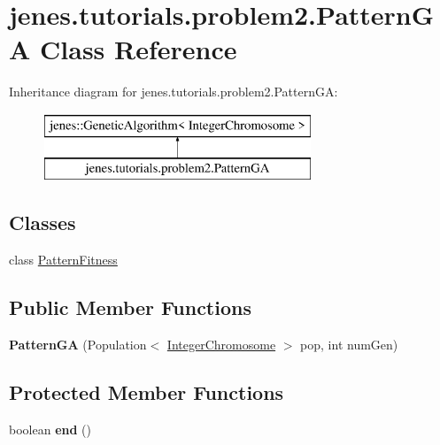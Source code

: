 \hypertarget{classjenes_1_1tutorials_1_1problem2_1_1_pattern_g_a}{\section{jenes.\-tutorials.\-problem2.\-Pattern\-G\-A Class Reference}
\label{classjenes_1_1tutorials_1_1problem2_1_1_pattern_g_a}
}
Inheritance diagram for jenes.\-tutorials.\-problem2.\-Pattern\-G\-A\-:\begin{figure}[H]
\begin{center}
\leavevmode
\includegraphics[height=2.000000cm]{classjenes_1_1tutorials_1_1problem2_1_1_pattern_g_a}
\end{center}
\end{figure}
\subsection*{Classes}
\begin{DoxyCompactItemize}
\item 
class \hyperlink{classjenes_1_1tutorials_1_1problem2_1_1_pattern_g_a_1_1_pattern_fitness}{Pattern\-Fitness}
\end{DoxyCompactItemize}
\subsection*{Public Member Functions}
\begin{DoxyCompactItemize}
\item 
\hypertarget{classjenes_1_1tutorials_1_1problem2_1_1_pattern_g_a_a009d1901fabdcabacb443297eb2295ce}{{\bfseries Pattern\-G\-A} (Population$<$ \hyperlink{classjenes_1_1chromosome_1_1_integer_chromosome}{Integer\-Chromosome} $>$ pop, int num\-Gen)}\label{classjenes_1_1tutorials_1_1problem2_1_1_pattern_g_a_a009d1901fabdcabacb443297eb2295ce}

\end{DoxyCompactItemize}
\subsection*{Protected Member Functions}
\begin{DoxyCompactItemize}
\item 
\hypertarget{classjenes_1_1tutorials_1_1problem2_1_1_pattern_g_a_a3785b5c77bc9bfab62fd3ef7c6ea8fb9}{boolean {\bfseries end} ()}\label{classjenes_1_1tutorials_1_1problem2_1_1_pattern_g_a_a3785b5c77bc9bfab62fd3ef7c6ea8fb9}

\end{DoxyCompactItemize}


